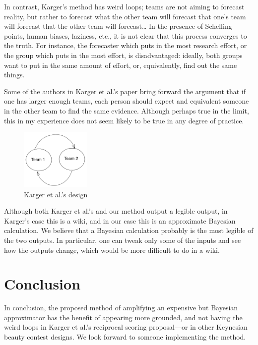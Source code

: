 \documentclass[]{article}
\begin{document}
In contrast, Karger's method has weird loops; teams are not aiming to
forecast reality, but rather to forecast what the other team will
forecast that one's team will forecast that the other team will
forecast\ldots{} In the presence of Schelling points, human biases,
laziness, etc., it is not clear that this process converges to the
truth. For instance, the forecaster which puts in the most research
effort, or the group which puts in the most effort, is disadvantaged:
ideally, both groups want to put in the same amount of effort, or,
equivalently, find out the same things.

Some of the authors in Karger et al.'s paper bring forward the argument
that if one has larger enough teams, each person should expect and
equivalent someone in the other team to find the same evidence. Although
perhaps true in the limit, this in my experience does not seem likely to
be true in any degree of practice.

\begin{figure}
\centering
\includegraphics[width=0.3\textwidth,height=\textheight]{diagrams/amplification-diagram-2.png}
\caption{Karger et al.'s design}
\end{figure}

Although both Karger et al.'s and our method output a legible output, in
Karger's case this is a wiki, and in our case this is an approximate
Bayesian calculation. We believe that a Bayesian calculation probably is
the most legible of the two outputs. In particular, one can tweak only
some of the inputs and see how the outputs change, which would be more
difficult to do in a wiki.

\hypertarget{conclusion}{%
\section{Conclusion}\label{conclusion}}

In conclusion, the proposed method of amplifying an expensive but
Bayesian approximator has the benefit of appearing more grounded, and
not having the weird loops in Karger et al.'s reciprocal scoring
proposal---or in other Keynesian beauty contest designs. We look forward
to someone implementing the method.
\end{document}
